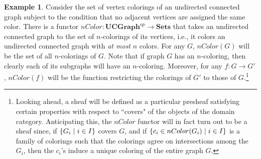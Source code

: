 \documentclass[a4paper]{book}
\theoremstyle{definition}
\newtheorem{example}{Example}[section]
\theoremstyle{definition}
\theoremstyle{definition}
\theoremstyle{theorem}
\theoremstyle{definition}
\begin{document}
\begin{example} 
	\label{example: ncoloring}
	Consider the set of vertex colorings of an undirected connected graph subject to the condition that no adjacent vertices are assigned the same color. There is a functor $nColor: \textbf{UCGraph}^{op} \rightarrow \textbf{Sets}$ that takes an undirected connected graph to the set of $n$-colorings of its vertices, i.e., it colors an undirected connected graph with \textit{at most} $n$ colors. For any $G$, $nColor(G)$ will be the set of all $n$-colorings of $G$. Note that if graph $G$ has an $n$-coloring, then clearly each of its subgraphs will have an $n$-coloring. Moreover, for any $f: G \rightarrow G'$, $nColor(f)$ will be the function restricting the colorings of $G'$ to those of $G$.\footnote{Looking ahead, a sheaf will be defined as a particular presheaf satisfying certain properties with respect to ``covers" of the objects of the domain category. Anticipating this, the $nColor$ functor will in fact turn out to be a sheaf since, if $\{G_i \hspace*{0.3em}| \hspace*{0.3em} i \in I\}$ covers $G$, and if $\{c_i \in nColor(G_i) \hspace*{0.3em}| \hspace*{0.3em} i \in I \}$ is a family of colorings such that the colorings agree on intersections among the $G_i$, then the $c_i$'s induce a unique coloring of the entire graph $G$.}
\end{example}  
\end{document}
